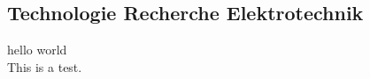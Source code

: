 \documentclass[../main.tex]{subfiles}
\begin{document}
\subsection{Technologie Recherche Elektrotechnik}
hello world\\
This is a test.
\end{document}
